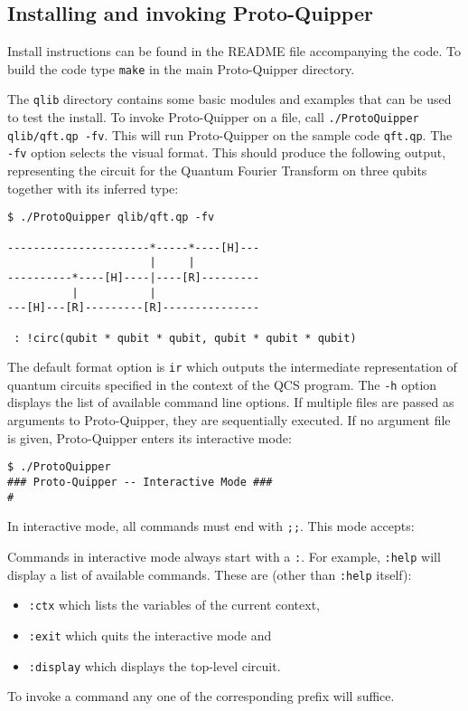\subsection{Installing and invoking Proto-Quipper}

Install instructions can be found in the README file accompanying the code. 
To build the code type \verb#make# in the main Proto-Quipper directory. 

The \verb#qlib# directory contains some basic modules and examples that can 
be used to test the install. To invoke Proto-Quipper on a file, call 
\verb#./ProtoQuipper qlib/qft.qp -fv#. This will run Proto-Quipper on the sample code \verb#qft.qp#. The \verb#-fv# option selects the visual format. 
This should produce the following output, representing the circuit for the 
Quantum Fourier Transform on three qubits together with its inferred 
type:
\begin{verbatim}
$ ./ProtoQuipper qlib/qft.qp -fv

----------------------*-----*----[H]---
                      |     |          
----------*----[H]----|----[R]---------
          |           |                
---[H]---[R]---------[R]---------------

 : !circ(qubit * qubit * qubit, qubit * qubit * qubit)
\end{verbatim}
The default format option is \verb#ir# which outputs the intermediate representation of quantum circuits specified in the context of the QCS program. The \verb#-h# option displays the list of available command line 
options. If multiple files are passed as arguments to Proto-Quipper, they 
are sequentially executed. If no argument file is given, Proto-Quipper 
enters its interactive mode:
\begin{verbatim}
$ ./ProtoQuipper
### Proto-Quipper -- Interactive Mode ###
# 
\end{verbatim}
In interactive mode, all commands must end with \verb#;;#. This mode accepts:
Commands in interactive mode always start with a \verb#:#. For example, 
\verb#:help# will display a list of available commands. These are (other 
than \verb#:help# itself): 
\begin{itemize}
  \item \verb#:ctx# which lists the variables of the current context, 
  \item \verb#:exit# which quits the interactive mode and
  \item \verb#:display# which displays the top-level circuit.
\end{itemize}
To invoke a command any one of the corresponding prefix will suffice.

